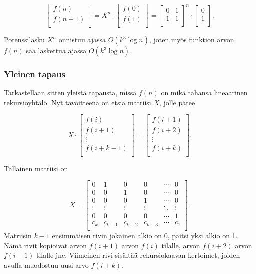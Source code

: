 \[
 \begin{bmatrix}
  f(n) \\
  f(n+1) \\
 \end{bmatrix}
=
X^n \cdot
 \begin{bmatrix}
  f(0) \\
  f(1) \\
 \end{bmatrix}
=
 \begin{bmatrix}
  0 & 1 \\
  1 & 1 \\
 \end{bmatrix}^n
\cdot
 \begin{bmatrix}
  0 \\
  1 \\
 \end{bmatrix}.
\]

Potenssilasku $X^n$ onnistuu ajassa
$O(k^3 \log n)$,
joten myös funktion arvon $f(n)$
saa laskettua ajassa $O(k^3 \log n)$.

\subsubsection{Yleinen tapaus}

Tarkastellaan sitten yleistä tapausta,
missä $f(n)$ on mikä tahansa lineaarinen
rekursioyhtälö. Nyt tavoitteena on etsiä
matriisi $X$, jolle pätee

\[ X \cdot
 \begin{bmatrix}
  f(i) \\
  f(i+1) \\
  \vdots \\
  f(i+k-1) \\
 \end{bmatrix}
=
 \begin{bmatrix}
  f(i+1) \\
  f(i+2) \\
  \vdots \\
  f(i+k) \\
 \end{bmatrix}.
\]

Tällainen matriisi on

\[
X =
 \begin{bmatrix}
  0 & 1 & 0 & 0 & \cdots & 0 \\
  0 & 0 & 1 & 0 & \cdots & 0 \\
  0 & 0 & 0 & 1 & \cdots & 0 \\
  \vdots & \vdots & \vdots & \vdots & \ddots & \vdots \\
  0 & 0 & 0 & 0 & \cdots & 1 \\
  c_k & c_{k-1} & c_{k-2} & c_{k-3} & \cdots & c_1 \\
 \end{bmatrix}.
\]
Matriisin $k-1$ ensimmäisen rivin jokainen alkio on 0,
paitsi yksi alkio on 1.
Nämä rivit kopioivat
arvon $f(i+1)$ arvon $f(i)$ tilalle,
arvon $f(i+2)$ arvon $f(i+1)$ tilalle jne.
Viimeinen rivi sisältää rekursiokaavan kertoimet,
joiden avulla muodostuu uusi arvo $f(i+k)$.

